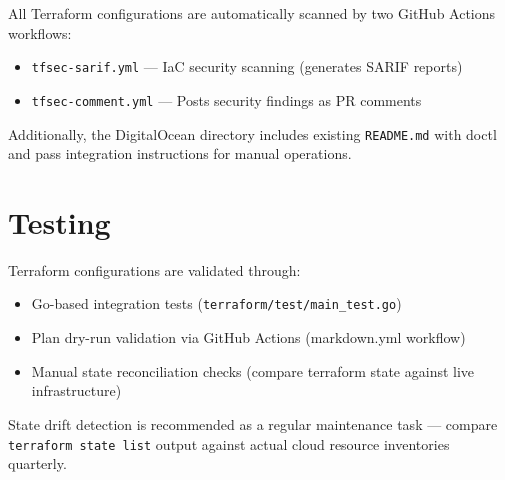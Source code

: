 All Terraform configurations are automatically scanned by two GitHub Actions workflows:
\begin{itemize}
    \item \texttt{tfsec-sarif.yml} — IaC security scanning (generates SARIF reports)
    \item \texttt{tfsec-comment.yml} — Posts security findings as PR comments
\end{itemize}

Additionally, the DigitalOcean directory includes existing \texttt{README.md} with doctl and pass integration instructions for manual operations.

\section{Testing}

Terraform configurations are validated through:
\begin{itemize}
    \item Go-based integration tests (\texttt{terraform/test/main\_test.go})
    \item Plan dry-run validation via GitHub Actions (markdown.yml workflow)
    \item Manual state reconciliation checks (compare terraform state against live infrastructure)
\end{itemize}

State drift detection is recommended as a regular maintenance task — compare \texttt{terraform state list} output against actual cloud resource inventories quarterly.
